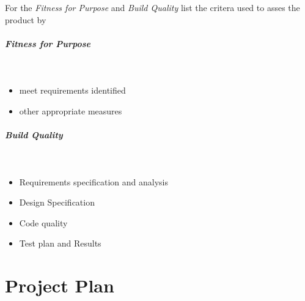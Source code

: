 For the \emph{Fitness for Purpose} and \emph{Build Quality}  list the critera used to asses the product by

\subparagraph{Fitness for Purpose}~
\begin{itemize}
	\item meet requirements identified
	\item other appropriate measures
\end{itemize}

\subparagraph{Build Quality}~
\begin{itemize}
	\item Requirements specification and analysis
	\item Design Specification
	\item Code quality
	\item Test plan and Results
\end{itemize}

\clearpage

\section{Project Plan}
\noindent
{}
